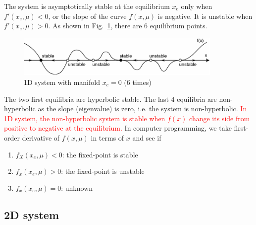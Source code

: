 The system is asymptotically stable at the equilibrium $x_e$ only when
$f'(x_e,\mu) < 0$, or the slope of the curve $f(x,\mu)$ is
negative. It is unstable when
$f'(x_e,\mu)>0$. %
As shown in Fig.~\ref{fig:1D_system}, there are 6 equilibrium points.

\begin{figure}[hbt]
  \centerline{\includegraphics[height=2cm,
    angle=0]{./images/1D_system.eps}}
\caption{1D system with manifold $x_e=0$ (6 times) }
\label{fig:1D_system}
\end{figure}

The two first equilibria are hyperbolic stable. The last 4 equilibria
are non-hyperbolic as the slope (eigenvalue) is zero, i.e. the system
is non-hyperbolic.
\textcolor{red}{In 1D system, the non-hyperbolic system is stable when
  $f(x)$ change its side from positive to negative at the
  equilibrium.} In computer programming, we take first-order
derivative of $f(x,\mu)$ in terms of $x$ and see if
\begin{enumerate}
\item $f_X(x_e,\mu)<0$: the fixed-point is stable
\item $f_x(x_e,\mu)>0$: the fixed-point is unstable
\item $f_x(x_e,\mu)=0$: unknown
\end{enumerate}

\subsection{2D system}
\label{sec:2d-system}

